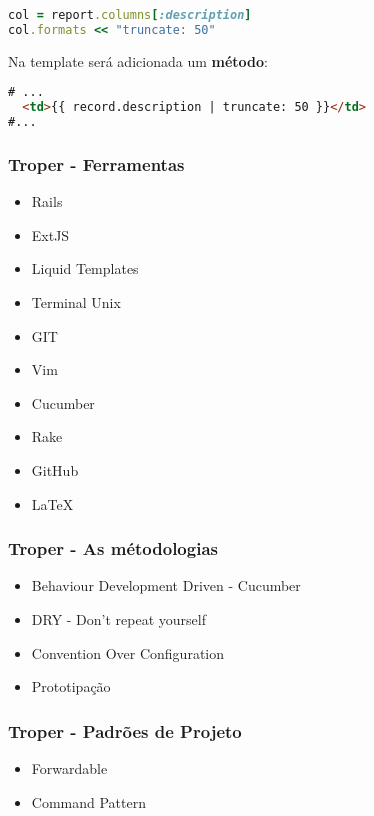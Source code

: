 \documentclass{beamer}
\begin{document}
\begin{frame}[fragile]
\begin{lstlisting}[language=ruby, caption=Adicionando formatadores]
col = report.columns[:description]
col.formats << "truncate: 50"
\end{lstlisting}

Na template será adicionada um \textbf{método}:

\begin{lstlisting}[language=html, caption=Exibindo na template]
# ...
  <td>{{ record.description | truncate: 50 }}</td>
#...
\end{lstlisting}

\end{frame}

\begin{frame} 
\frametitle{Troper - Ferramentas}
  \begin{itemize} 
    \item Rails
    \item ExtJS 
    \item Liquid Templates 
    \item Terminal Unix 
    \item GIT 
    \item Vim 
    \item Cucumber
    \item Rake 
    \item GitHub 
    \item LaTeX
  \end{itemize} 
\end{frame}

\begin{frame}
\frametitle{Troper - As métodologias}
  \begin{itemize} 
    \item Behaviour Development Driven - Cucumber
    \item DRY - Don't repeat yourself 
    \item Convention Over Configuration
    \item Prototipação 
  \end{itemize} 
\end{frame}

\begin{frame}
\frametitle{Troper - Padrões de Projeto}
  \begin{itemize} 
    \item Forwardable
    \item Command Pattern 
  \end{itemize} 
\end{frame}
\end{document}
